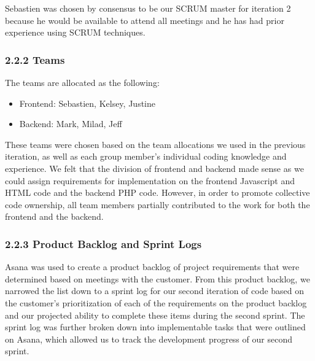 \documentclass[]{article}
\begin{document}
Sebastien was chosen by consensus to be our SCRUM master for iteration 2
because he would be available to attend all meetings and he has had
prior experience using SCRUM techniques.

\subsubsection{2.2.2 Teams}\label{teams}

The teams are allocated as the following:

\begin{itemize}
\itemsep1pt\parskip0pt
\item
  Frontend: Sebastien, Kelsey, Justine
\item
  Backend: Mark, Milad, Jeff
\end{itemize}

These teams were chosen based on the team allocations we used in the
previous iteration, as well as each group member's individual coding
knowledge and experience. We felt that the division of frontend and
backend made sense as we could assign requirements for implementation on
the frontend Javascript and HTML code and the backend PHP code. However,
in order to promote collective code ownership, all team members
partially contributed to the work for both the frontend and the backend.

\subsubsection{2.2.3 Product Backlog and Sprint
Logs}\label{product-backlog-and-sprint-logs}

Asana was used to create a product backlog of project requirements that
were determined based on meetings with the customer. From this product
backlog, we narrowed the list down to a sprint log for our second
iteration of code based on the customer's prioritization of each of the
requirements on the product backlog and our projected ability to
complete these items during the second sprint. The sprint log was
further broken down into implementable tasks that were outlined on
Asana, which allowed us to track the development progress of our second
sprint.
\end{document}
